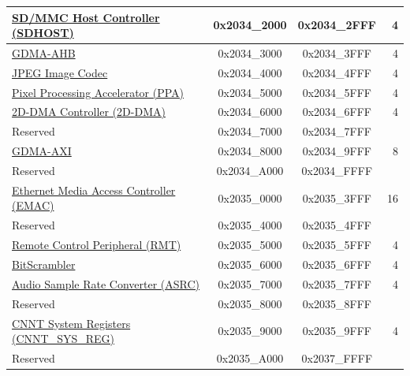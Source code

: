 \begin{ThreePartTable}
\begin{longtable}[c]{ |p{7cm}|c|c|r| }
    \hyperref[mod:sdhost]{SD/MMC Host Controller (SDHOST)} & 0x2034\_2000 & 0x2034\_2FFF &   4\\\hline
    \hyperref[mod:dma]{GDMA-AHB} & 0x2034\_3000 & 0x2034\_3FFF &   4\\\hline
    \hyperref[mod:jpegcodec]{JPEG Image Codec} & 0x2034\_4000 & 0x2034\_4FFF &   4\\\hline
    \hyperref[mod:ppa]{Pixel Processing Accelerator (PPA)} & 0x2034\_5000 & 0x2034\_5FFF &   4\\\hline
    \hyperref[mod:2ddma]{2D-DMA Controller (2D-DMA)} & 0x2034\_6000 & 0x2034\_6FFF &   4\\\hline
        \rowcolor{gray!25}  Reserved        & 0x2034\_7000 & 0x2034\_7FFF &    \\\hline
    \hyperref[mod:dma]{GDMA-AXI} & 0x2034\_8000 & 0x2034\_9FFF &   8\\\hline
        \rowcolor{gray!25}  Reserved        & 0x2034\_A000 & 0x2034\_FFFF &    \\\hline
    \hyperref[mod:ethernetmac]{Ethernet Media Access Controller (EMAC)} & 0x2035\_0000 & 0x2035\_3FFF &  16\\\hline
        \rowcolor{gray!25}  Reserved        & 0x2035\_4000 & 0x2035\_4FFF &    \\\hline

    \hyperref[mod:rmt]{Remote Control Peripheral (RMT)} & 0x2035\_5000 & 0x2035\_5FFF &   4\\\hline
    \hyperref[mod:bitscrm]{BitScrambler} & 0x2035\_6000 & 0x2035\_6FFF &   4\\\hline
    \hyperref[mod:asrc]{Audio Sample Rate Converter (ASRC)} & 0x2035\_7000 & 0x2035\_7FFF &   4\\\hline
        \rowcolor{gray!25}  Reserved        & 0x2035\_8000 & 0x2035\_8FFF &    \\\hline
    \hyperref[mod:sysreg]{CNNT System Registers (CNNT\_SYS\_REG)} & 0x2035\_9000 & 0x2035\_9FFF &   4\\\hline
        \rowcolor{gray!25}  Reserved        & 0x2035\_A000 & 0x2037\_FFFF &    \\\hline


\end{longtable}
\end{ThreePartTable}
